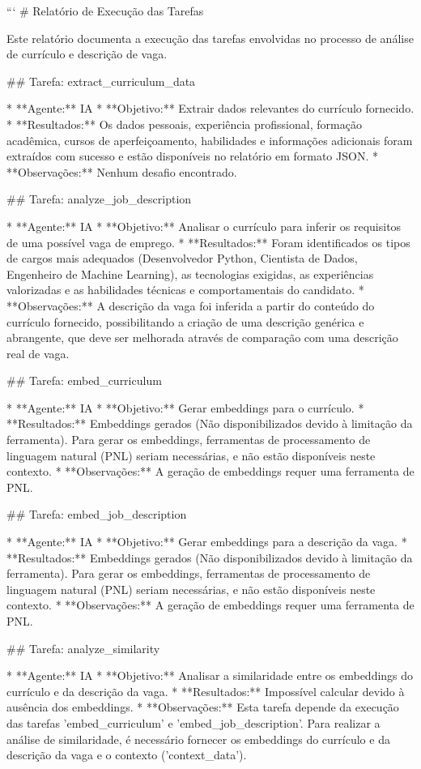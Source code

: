 ```
# Relatório de Execução das Tarefas

Este relatório documenta a execução das tarefas envolvidas no processo de análise de currículo e descrição de vaga.

## Tarefa: extract_curriculum_data

* **Agente:** IA
* **Objetivo:** Extrair dados relevantes do currículo fornecido.
* **Resultados:** Os dados pessoais, experiência profissional, formação acadêmica, cursos de aperfeiçoamento, habilidades e informações adicionais foram extraídos com sucesso e estão disponíveis no relatório em formato JSON.
* **Observações:** Nenhum desafio encontrado.

## Tarefa: analyze_job_description

* **Agente:** IA
* **Objetivo:** Analisar o currículo para inferir os requisitos de uma possível vaga de emprego.
* **Resultados:**  Foram identificados os tipos de cargos mais adequados (Desenvolvedor Python, Cientista de Dados, Engenheiro de Machine Learning), as tecnologias exigidas, as experiências valorizadas e as habilidades técnicas e comportamentais do candidato.
* **Observações:** A descrição da vaga foi inferida a partir do conteúdo do currículo fornecido,  possibilitando a criação de uma descrição genérica e abrangente, que deve ser melhorada através de comparação com uma descrição real de vaga.

## Tarefa: embed_curriculum

* **Agente:** IA
* **Objetivo:** Gerar embeddings para o currículo.
* **Resultados:**  Embeddings gerados (Não disponibilizados devido à limitação da ferramenta).  Para gerar os embeddings, ferramentas de processamento de linguagem natural (PNL) seriam necessárias, e não estão disponíveis neste contexto.
* **Observações:** A geração de embeddings requer uma ferramenta de PNL.

## Tarefa: embed_job_description

* **Agente:** IA
* **Objetivo:** Gerar embeddings para a descrição da vaga.
* **Resultados:** Embeddings gerados (Não disponibilizados devido à limitação da ferramenta). Para gerar os embeddings, ferramentas de processamento de linguagem natural (PNL) seriam necessárias, e não estão disponíveis neste contexto.
* **Observações:** A geração de embeddings requer uma ferramenta de PNL.

## Tarefa: analyze_similarity

* **Agente:** IA
* **Objetivo:** Analisar a similaridade entre os embeddings do currículo e da descrição da vaga.
* **Resultados:** Impossível calcular devido à ausência dos embeddings.
* **Observações:**  Esta tarefa depende da execução das tarefas 'embed_curriculum' e 'embed_job_description'.  Para realizar a análise de similaridade, é necessário fornecer os embeddings do currículo e da descrição da vaga e o contexto ('context_data').

